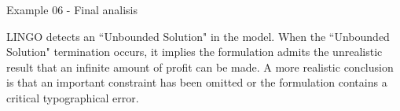 \begin{frame}{Example 06 - Final analisis}

LINGO detects an ``Unbounded Solution" in the model. When the
``Unbounded Solution" termination occurs, it implies the formulation admits the
unrealistic result that an infinite amount of profit can be made. A more
realistic conclusion is that an important constraint has been omitted or the
formulation contains a critical typographical error.

\end{frame}
